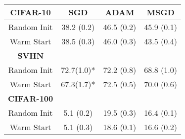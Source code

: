 \begin{tabular}{cccc}
\textbf{CIFAR-10}  & SGD     & ADAM    & MSGD \\ \hline
Random Init        & 38.2 (0.2) & 46.5 (0.2) & 45.9 (0.1)                  \\
Warm Start         & 38.5 (0.3) & 46.0 (0.3) & 43.5 (0.4)                  \\
\textbf{SVHN}      &         &         & \\ \hline
Random Init        & 72.7(1.0)* & 72.2 (0.8) & 68.8 (1.0)                  \\
Warm Start         & 67.3(1.7)* & 72.5 (0.5) & 70.0 (0.6)                  \\
\textbf{CIFAR-100} &         &         & \\ \hline
Random Init        & 5.1 (0.2) & 19.5 (0.3) & 16.4 (0.1)                 \\
Warm Start         & 5.1 (0.3) & 18.6 (0.1) & 16.6 (0.2)\\                   
\end{tabular}